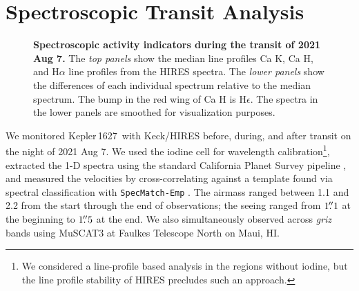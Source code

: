 \documentclass[12pt,modern,twocolumn,tighten]{aastex63}
\newcommand{\sn}{Kepler\,1627} %
\begin{document}
\section{Spectroscopic Transit Analysis}
\label{app:rm}

\begin{figure}[tp]
	\begin{center}
		\leavevmode
	\end{center}
	\vspace{-0.5cm}
	\caption{
    {\bf Spectroscopic activity indicators during the transit of 2021
    Aug 7.} The {\it top panels} show the median line profiles Ca K,
    Ca H, and H$\alpha$ line profiles from the HIRES spectra.  The
    {\it lower panels} show the differences of each individual
    spectrum relative to the median spectrum.  The bump in the red
    wing of Ca H is H$\epsilon$.
    The spectra in the lower panels are smoothed for visualization
    purposes.
    \label{fig:rvactivity}
	}
\end{figure}

We monitored \sn\ with Keck/HIRES before, during, and after transit on
the night of 2021 Aug 7.  We used the iodine cell for wavelength
calibration\footnote{We considered a line-profile based analysis in
the regions without iodine, but the line profile stability of HIRES
precludes such an approach.}, extracted the 1-D spectra using the
standard California Planet Survey pipeline \citep{howard_cps_2010},
and measured the velocities by cross-correlating against a template
found via spectral classification with \texttt{SpecMatch-Emp}
\citep{yee_SM_2017}.  The airmass ranged between 1.1 and 2.2 from the
start through the end of observations; the seeing ranged from
$1\mbox{$.\!\!^{\prime\prime}$}1$ at the beginning to $1\mbox{$.\!\!^{\prime\prime}$}5$ at the end.  We also
simultaneously observed across {\it griz} bands using MuSCAT3 at
Faulkes Telescope North on Maui, HI.
\end{document}
